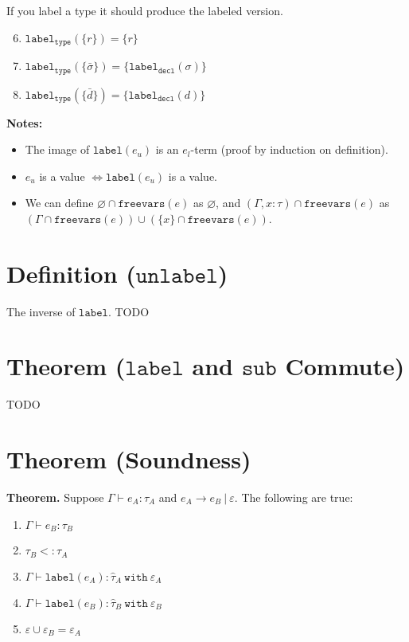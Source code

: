 \documentclass{llncs}
\newcommand{\keywadj}[1]{\mathtt{#1}}
\newcommand{\keyw}[1]{\keywadj{#1}~}
\newcommand{\kwa}[1]{\keywadj{ #1 }}
\newcommand{\type}[2]{
	#1~\keyw{with} #2
}
\begin{document}
\noindent
If you label a type it should produce the labeled version.

\begin{enumerate}
	\setcounter{enumi}{5}
	\item $\kwa{label_{type}}(\{ r \}) = \{ r \}$
	\item $\kwa{label_{type}}(\{ \bar \sigma \}) = \{ \kwa{label_{decl}}(\sigma) \}$
	\item $\kwa{label_{type}}(\{ \bar d \}) = \{ \kwa{label_{decl}}(d) \}$
\end{enumerate}

\noindent \textbf{Notes:}
\begin{itemize}
	\item The image of $\kwa{label}(e_u)$ is an $e_l$-term (proof by induction on definition).
	\item $e_u$ is a value $\iff \kwa{label}(e_u)$ is a value.
	\item We can define $\varnothing \cap \kwa{freevars}(e)$ as $\varnothing$, and $(\Gamma, x : \tau) \cap \kwa{freevars}(e)$ as $(\Gamma \cap \kwa{freevars}(e)) \cup (\{ x \} \cap \kwa{freevars}(e))$.
\end{itemize}





\section{Definition ($\keywadj{unlabel}$)}

The inverse of $\kwa{label}$. TODO






\section{Theorem ($\kwa{label}$ and $\kwa{sub}$ Commute)}

TODO


\section{Theorem (Soundness)}

\textbf{Theorem.} Suppose $\Gamma \vdash e_A : \tau_A$ and $e_A \longrightarrow e_B~|~\varepsilon$. The following are true:

	\begin{enumerate}
	\item $\Gamma \vdash e_B : \tau_B$
	\item $\tau_B <: \tau_A$
	\item $\Gamma \vdash \kwa{label}(e_A) : \type{\hat \tau_A}{\varepsilon_A}$
	\item $\Gamma \vdash \kwa{label}(e_B) : \type{\hat \tau_B}{\varepsilon_B}$
	\item $\varepsilon \cup \varepsilon_B = \varepsilon_A$
	\end{enumerate}
\end{document}
